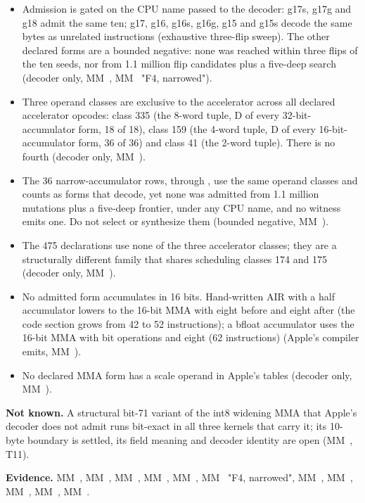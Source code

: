\begin{itemize}
\item Admission is gated on the CPU name passed to the decoder: g17s, g17g and g18 admit the same ten; g17, g16, g16s,
  g16g, g15 and g15s decode the same bytes as unrelated instructions (exhaustive three-flip sweep). The other declared
  forms are a bounded negative: none was reached within three flips of the ten seeds, nor from 1.1 million flip
  candidates plus a five-deep search (decoder only, MM~, MM~ "F4, narrowed").
\item Three operand classes are exclusive to the accelerator across all declared accelerator opcodes: class 335 (the
  8-word tuple, D of every 32-bit-accumulator form, 18 of 18), class 159 (the 4-word tuple, D of every
  16-bit-accumulator form, 36 of 36) and class 41 (the 2-word tuple). There is no fourth (decoder only, MM~).
\item The 36 narrow-accumulator rows,  through , use the same operand classes and counts as forms that decode,
  yet none was admitted from 1.1 million mutations plus a five-deep frontier, under any CPU name, and no witness emits
  one. Do not select or synthesize them (bounded negative, MM~).
\item The 475  declarations use none of the three accelerator classes; they are a structurally different family
  that shares scheduling classes 174 and 175 (decoder only, MM~).
\item No admitted form accumulates in 16 bits. Hand-written AIR with a half accumulator lowers to the 16-bit MMA with
  eight  before and eight  after (the code section grows
  from 42 to 52 instructions); a bfloat accumulator uses the 16-bit MMA with bit operations and eight  (62 instructions) (Apple's compiler emits, MM~).
\item No declared MMA form has a scale operand in Apple's tables (decoder only, MM~).
\end{itemize}

\textbf{Not known.} A structural bit-71 variant of the int8 widening MMA that Apple's decoder  does not
admit runs bit-exact in all three kernels that carry it; its 10-byte boundary is settled, its field meaning and decoder
identity are open (MM~, T11).

\textbf{Evidence.} MM~, MM~, MM~, MM~, MM~, MM~ "F4, narrowed", MM~, MM~, MM~, MM~,
MM~.

